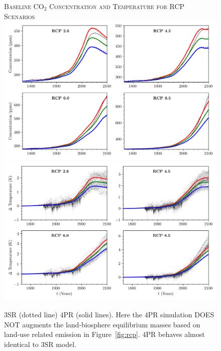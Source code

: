 \documentclass[11pt, a4paper, pdftex, twoside, dvipsnames]{article}
\renewcommand{\ref}{\cref}
\begin{document}
\begin{figure}[!htbp]
    \centering
    \textsc{Baseline CO$_2$ Concentration and Temperature for RCP Scenarios}\vspace{2em}
\noindent %
	\includegraphics[width=\textwidth]{fig/simulations_rcp_conc_base_both}
	\includegraphics[width=\textwidth]{fig/simulations_rcp_temp_base_both}
	\caption{
$3$SR (dotted line) $4$PR (solid lines). Here the $4$PR simulation DOES NOT augments the land-biosphere equilibrium masses based on land-use related emission in Figure~\ref{fig:rcp}. $4$PR behaves almost identical to 3SR model.
     }
    \label{fig:6}
\end{figure}
%
\end{document}
